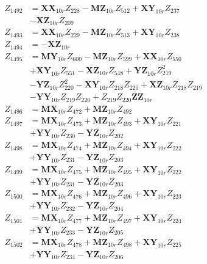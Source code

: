 \begin{multicols}{2}
\begin{align}
Z_{1492} &= \mathbf{XX}_{10r}Z_{228} - \mathbf{MZ}_{10r}Z_{512} + \mathbf{XY}_{10r}Z_{237}  \nonumber \\
&- \mathbf{XZ}_{10r}Z_{209} \nonumber \\
Z_{1493} &= \mathbf{XX}_{10r}Z_{229} - \mathbf{MZ}_{10r}Z_{513} + \mathbf{XY}_{10r}Z_{238} \nonumber \\
Z_{1494} &= -\mathbf{XZ}_{10r} \nonumber \\
Z_{1495} &= \mathbf{MY}_{10r}Z_{600} - \mathbf{MZ}_{10r}Z_{599} + \mathbf{XX}_{10r}Z_{550}  \nonumber \\
&+ \mathbf{XY}_{10r}Z_{551} - \mathbf{XZ}_{10r}Z_{548} + \mathbf{YZ}_{10r}Z_{219}^2  \nonumber \\
&- \mathbf{YZ}_{10r}Z_{220}^2 - \mathbf{XY}_{10r}Z_{218}Z_{220} + \mathbf{XZ}_{10r}Z_{218}Z_{219}  \nonumber \\
&- \mathbf{YY}_{10r}Z_{219}Z_{220} + Z_{219}Z_{220}\mathbf{ZZ}_{10r} \nonumber \\
Z_{1496} &= \mathbf{MX}_{10r}Z_{472} + \mathbf{MZ}_{10r}Z_{492} \nonumber \\
Z_{1497} &= \mathbf{MX}_{10r}Z_{473} + \mathbf{MZ}_{10r}Z_{493} + \mathbf{XY}_{10r}Z_{221}  \nonumber \\
&+ \mathbf{YY}_{10r}Z_{230} - \mathbf{YZ}_{10r}Z_{202} \nonumber \\
Z_{1498} &= \mathbf{MX}_{10r}Z_{474} + \mathbf{MZ}_{10r}Z_{494} + \mathbf{XY}_{10r}Z_{222}  \nonumber \\
&+ \mathbf{YY}_{10r}Z_{231} - \mathbf{YZ}_{10r}Z_{203} \nonumber \\
Z_{1499} &= \mathbf{MX}_{10r}Z_{475} + \mathbf{MZ}_{10r}Z_{495} + \mathbf{XY}_{10r}Z_{222}  \nonumber \\
&+ \mathbf{YY}_{10r}Z_{231} - \mathbf{YZ}_{10r}Z_{203} \nonumber \\
Z_{1500} &= \mathbf{MX}_{10r}Z_{476} + \mathbf{MZ}_{10r}Z_{496} + \mathbf{XY}_{10r}Z_{223}  \nonumber \\
&+ \mathbf{YY}_{10r}Z_{232} - \mathbf{YZ}_{10r}Z_{204} \nonumber \\
Z_{1501} &= \mathbf{MX}_{10r}Z_{477} + \mathbf{MZ}_{10r}Z_{497} + \mathbf{XY}_{10r}Z_{224}  \nonumber \\
&+ \mathbf{YY}_{10r}Z_{233} - \mathbf{YZ}_{10r}Z_{205} \nonumber \\
Z_{1502} &= \mathbf{MX}_{10r}Z_{478} + \mathbf{MZ}_{10r}Z_{498} + \mathbf{XY}_{10r}Z_{225}  \nonumber \\
&+ \mathbf{YY}_{10r}Z_{234} - \mathbf{YZ}_{10r}Z_{206} \nonumber \\

\end{align}
\end{multicols}
